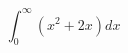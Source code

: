 \documentclass{article}
\begin{document}
\begin{huge}

\[\int_{0}^{\infty} {(x^2+2x)dx}\]

\end{huge}
\end{document}
